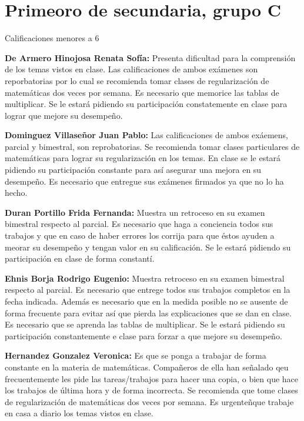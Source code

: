 \documentclass{article}
\begin{document}
\section*{\sc Primeoro de secundaria, grupo C}

{\Large Calificaciones menores a 6}
\vspace{3mm}

\textbf{De Armero Hinojosa Renata Sof\'ia:} Presenta dificultad para la comprensi\'on de los temas vistos en clase. Las calificaciones de ambos ex\'amenes son reporbatorias por lo cual se recomienda tomar clases de regularizaci\'on de matem\'aticas dos veces por semana. Es necesario que memorice las tablas de multiplicar. Se le estar\'a pidiendo su participaci\'on constatemente en clase para lograr que mejore su desempe\~no.

\textbf{Dominguez Villase\~nor Juan Pablo:} Las calificaciones de ambos ex\'aemens, parcial y bimestral, son reprobatorias. Se recomienda tomar clases particulares de matem\'aticas para lograr su regularizaci\'on en los temas. En clase se le estar\'a pidiendo su participaci\'on constante para as\'i asegurar una mejora en su desempe\~no. Es necesario que entregue sus ex\'amenes firmados ya que no lo ha hecho.

\textbf{Duran Portillo Frida Fernanda:} Muestra un retroceso en su examen bimestral respecto al parcial. Es necesario que haga a conciencia todos sus trabajos y que en caso de haber errores los corrija para que \'estos ayuden a meorar su desempe\~no y tengan valor en su calificaci\'on. Se le estar\'a pidiendo su participaci\'on en clase de forma constant\'i.

\textbf{Ehnis Borja Rodrigo Eugenio:} Muestra retroceso en su examen bimestral respecto al parcial. Es necesario que entrege todos sus trabajos completos en la fecha indicada. Adem\'as es necesario que en la medida posible no se ausente de forma frecuente para evitar as\'i que pierda las explicaciones que se dan en clase. Es necesario que se aprenda las tablas de multiplicar. Se le estar\'a pidiendo su participaci\'on constantemente e clase para forzar a que mejore su desempe\~no.

\textbf{Hernandez Gonzalez Veronica:} Es que se ponga a trabajar de forma constante en la materia de matem\'aticas. Compa\~neros de ella han se\~nalado qeu frecuentemente les pide las tareas/trabajos para hacer una copia, o bien que hace los trabajos de \'ultima hora y de forma incorrecta. Se recomienda que tome clases de regularizaci\'on de matem\'aticas dos veces por semana. Es urgente\~nque trabaje en casa a diario los temas vistos en clase.
\end{document}
